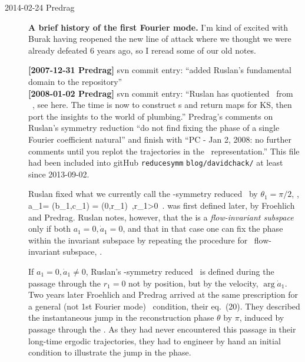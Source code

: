 \begin{description}
\item[2014-02-24 Predrag]
\textbf{A brief history of the first Fourier mode.}
I'm kind of excited with Burak having reopened the new line of
attack where we thought we were already defeated 6 years ago, so
I reread some of our old notes.

\noindent
{\bf [2007-12-31 Predrag]} svn commit entry:
``added Ruslan's fundamental domain to the repository''
\\
{\bf [2008-01-02 Predrag]} svn commit entry: ``Ruslan has quotiented
\ from \KS\ \statesp, see 
{here}. The time is now to construct \PoincSec s and return maps
for KS, then port the insights to the world of plumbing.'' Predrag's
comments on Ruslan's symmetry reduction ``do not find fixing the phase
of a single
Fourier coefficient natural'' and finish with ``PC - Jan 2, 2008: no
further comments until you replot the trajectories in the \statesp\
representation.'' This file had been included into gitHub
\texttt{reducesymm} \texttt{blog/davidchack/} at least since 2013-09-02.

Ruslan fixed what we currently call the
-symmetry reduced \slicePlane\ by $\theta_1=\pi/2$, \ie,
\beq
a_1= (b_1,c_1) = (0,r_1)
    \,,\qquad r_1>0
\,.
{\ChartBord} was first defined later, by Froehlich and
Predrag. Ruslan notes, however, that the {\chartBord} is a
\emph{flow-invariant subspace} only if both $a_1=0, \dot{a}_1=0$,
and that in that case one can fix the phase within the invariant subspace
by repeating the procedure for \Zn{2}\ flow-invariant subspace, \etc.

If  $a_1=0, \dot{a}_1\neq 0$, Ruslan's
-symmetry reduced \slicePlane\ is defined during the passage
through the $r_1=0$ {\chartBord} not by position, but by the velocity,
$\arg \dot{a}_1$. Two years later Froehlich and Predrag arrived
at the same prescription for a general (not 1st Fourier
mode) \slice\ condition, their
{eq.~(20)}. They described the instantaneous jump in the
reconstruction phase $\theta$ by $\pi$, induced by passage through the
{\chartBord}. As they had never encountered this passage in their
long-time ergodic trajectories, they had to engineer by hand
an initial condition to illustrate the jump in the phase.


\end{description}
